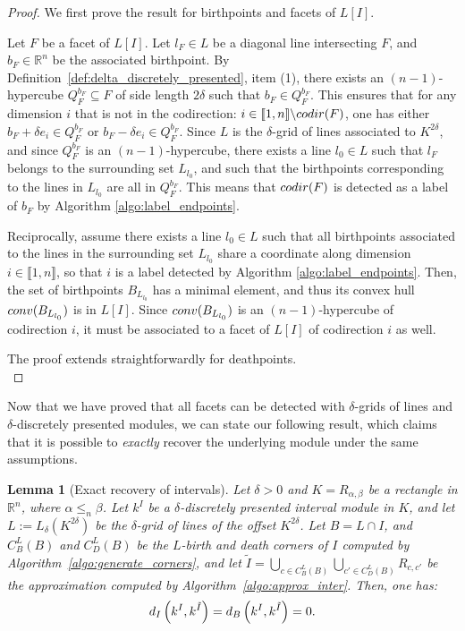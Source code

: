 \documentclass{article}
\newcommand{\conv}[1]{ {\rm conv}(#1) }
\newcommand{\codir}[1]{ {\rm codir}(#1) }
\newcommand{\R}{\mathbb{R}}
\newcommand{\disti}{{d_{\rm I}}}
\newcommand{\distb}{{d_{\rm B}}}
\newcommand{\leqn}{\leq_n}
\newcommand{\lowerb}[1]{ L[#1] }
\newcommand{\birthLcp}[1]{ C_B^L(#1) }
\newcommand{\deathLcp}[1]{ C_D^L(#1) }
\newcommand{\rectangle}[2]{ R_{#1, #2} }
\newtheorem{lemma}[theorem]{Lemma}
\begin{document}
\begin{proof}
	We first prove the result for birthpoints and facets of $\lowerb{I}$.

	Let $F$ be a facet of $\lowerb{I}$.
	Let $l_F\in L$ be a diagonal line intersecting $F$, and $b_F\in\R^n$ be the associated birthpoint.
	By Definition~\ref{def:delta_discretely_presented}, item (1), there exists an $(n-1)$-hypercube $Q_F^{b_F}\subseteq F$ of side length $2\delta$
	such that $b_F\in Q_F^{b_F}$. %
	This ensures that for any dimension $i$ that is not in the codirection: $i\in \llbracket 1,n\rrbracket\backslash\codir{F}$, one has
	either $b_F + \delta e_i\in Q_F^{b_F}$ or $b_F - \delta e_i \in Q_F^{b_F}$.
	Since $L$ is the $\delta$-grid of lines associated to $K^{2\delta}$, and since $Q_F^{b_F}$ is an $(n-1)$-hypercube,
	there exists a line $l_0\in L$ such that $l_F$ belongs to the surrounding set $L_{l_0}$,
	and such that the birthpoints corresponding to the lines in $L_{l_0}$ are all in $Q_F^{b_F}$. %
	This means that $\codir{F}$ is detected as a label of $b_F$ by Algorithm \ref{algo:label_endpoints}. %

	Reciprocally, assume there exists a line $l_0\in L$ such that all birthpoints associated to the lines in the
	surrounding set $L_{l_0}$
	share a coordinate along dimension $i\in\llbracket 1,n \rrbracket$, so that $i$ is a label detected by Algorithm \ref{algo:label_endpoints}.
	Then, the set of birthpoints $B_{L_{l_0}}$ has a minimal element, and thus its convex hull $\conv{B_{L_{l_0}}}$ is in $\lowerb{I}$.
	Since $\conv{B_{L_{l_0}}}$ is an $(n-1)$-hypercube of codirection $i$, it must be associated to a facet of $\lowerb{I}$ of codirection $i$ as well.

	The proof extends straightforwardly for deathpoints. \\
\end{proof}

Now that we have proved that all facets can be detected with $\delta$-grids of lines and $\delta$-discretely presented modules, we can state our following result,
which claims that it is possible to {\em exactly} recover the underlying module under the same assumptions. \\

\begin{lemma}[Exact recovery of intervals]\label{lemma:exact_recov_int}
	Let $\delta > 0$ and $K=\rectangle{\alpha}{\beta}$ be a rectangle in $\R^n$, where $\alpha \leqn \beta$. Let
	${k^{I}}$ be a $ \delta$-discretely presented interval module in $K$, and let $L:=L_\delta(K^{2\delta})$ be the $\delta$-grid of lines of the offset $K^{2\delta}$.
	Let {$B=L\cap I$}, and $\birthLcp{B}$ and $\deathLcp{B}$ be the $L$-birth and death corners of $I$ computed by Algorithm~\ref{algo:generate_corners}, and let
	$\tilde I=\bigcup_{c \in \birthLcp{B}}\bigcup_{c' \in \deathLcp{B}} R_{c,c'}$ be the approximation computed by Algorithm~\ref{algo:approx_inter}.
	Then,
	one has:
	\begin{equation}
		\disti\left({k^{I}},{k^{\tilde I}}\right)=\distb\left({k^{I}},{k^{\tilde I}}\right)=0.
	\end{equation}


\end{lemma}
\end{document}
